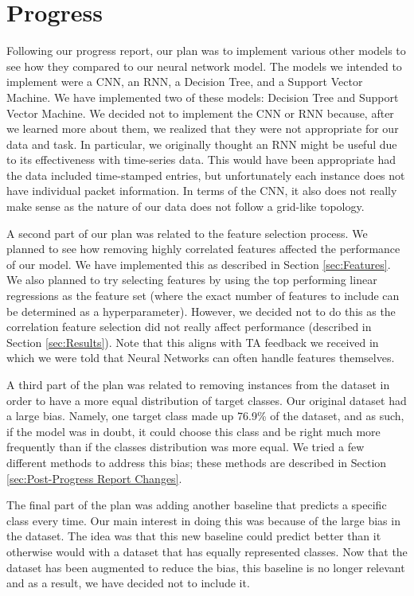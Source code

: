 \documentclass[11pt]{article}
\begin{document}
\section{Progress}

Following our progress report, our plan was to implement various other models to see how they compared to our neural network model. The models we intended to implement were a CNN, an RNN, a Decision Tree, and a Support Vector Machine. We have implemented two of these models: Decision Tree and Support Vector Machine. We decided not to implement the CNN or RNN because, after we learned more about them, we realized that they were not appropriate for our data and task. In particular, we originally thought an RNN might be useful due to its effectiveness with time-series data. This would have been appropriate had the data included time-stamped entries, but unfortunately each instance does not have individual packet information. In terms of the CNN, it also does not really make sense as the nature of our data does not follow a grid-like topology.

A second part of our plan was related to the feature selection process. We planned to see how removing highly correlated features affected the performance of our model. We have implemented this as described in Section \ref{sec:Features}. We also planned to try selecting features by using the top performing linear regressions as the feature set (where the exact number of features to include can be determined as a hyperparameter). However, we decided not to do this as the correlation feature selection did not really affect performance (described in Section \ref{sec:Results}). Note that this aligns with TA feedback we received in which we were told that Neural Networks can often handle features themselves.

A third part of the plan was related to removing instances from the dataset in order to have a more equal distribution of target classes. Our original dataset had a large bias. Namely, one target class made up 76.9\% of the dataset, and as such, if the model was in doubt, it could choose this class and be right much more frequently than if the classes distribution was more equal. We tried a few different methods to address this bias; these methods are described in Section \ref{sec:Post-Progress Report Changes}.

The final part of the plan was adding another baseline that predicts a specific class every time. Our main interest in doing this was because of the large bias in the dataset. The idea was that this new baseline could predict better than it otherwise would with a dataset that has equally represented classes. Now that the dataset has been augmented to reduce the bias, this baseline is no longer relevant and as a result, we have decided not to include it.
\end{document}

